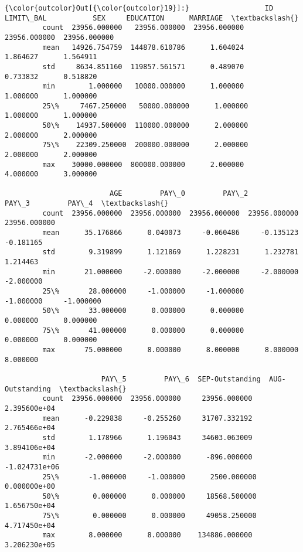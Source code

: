 \documentclass[11pt]{article}
\begin{document}
\begin{Verbatim}[commandchars=\\\{\}]
{\color{outcolor}Out[{\color{outcolor}19}]:}                  ID      LIMIT\_BAL           SEX     EDUCATION      MARRIAGE  \textbackslash{}
         count  23956.000000   23956.000000  23956.000000  23956.000000  23956.000000   
         mean   14926.754759  144878.610786      1.604024      1.864627      1.564911   
         std     8634.851160  119857.561571      0.489070      0.733832      0.518820   
         min        1.000000   10000.000000      1.000000      1.000000      1.000000   
         25\%     7467.250000   50000.000000      1.000000      1.000000      1.000000   
         50\%    14937.500000  110000.000000      2.000000      2.000000      2.000000   
         75\%    22309.250000  200000.000000      2.000000      2.000000      2.000000   
         max    30000.000000  800000.000000      2.000000      4.000000      3.000000   
         
                         AGE         PAY\_0         PAY\_2         PAY\_3         PAY\_4  \textbackslash{}
         count  23956.000000  23956.000000  23956.000000  23956.000000  23956.000000   
         mean      35.176866      0.040073     -0.060486     -0.135123     -0.181165   
         std        9.319899      1.121869      1.228231      1.232781      1.214463   
         min       21.000000     -2.000000     -2.000000     -2.000000     -2.000000   
         25\%       28.000000     -1.000000     -1.000000     -1.000000     -1.000000   
         50\%       33.000000      0.000000      0.000000      0.000000      0.000000   
         75\%       41.000000      0.000000      0.000000      0.000000      0.000000   
         max       75.000000      8.000000      8.000000      8.000000      8.000000   
         
                       PAY\_5         PAY\_6  SEP-Outstanding  AUG-Outstanding  \textbackslash{}
         count  23956.000000  23956.000000     23956.000000     2.395600e+04   
         mean      -0.229838     -0.255260     31707.332192     2.765466e+04   
         std        1.178966      1.196043     34603.063009     3.894106e+04   
         min       -2.000000     -2.000000      -896.000000    -1.024731e+06   
         25\%       -1.000000     -1.000000      2500.000000     0.000000e+00   
         50\%        0.000000      0.000000     18568.500000     1.656750e+04   
         75\%        0.000000      0.000000     49058.250000     4.717450e+04   
         max        8.000000      8.000000    134886.000000     3.206230e+05   
         

\end{Verbatim}
\end{document}
